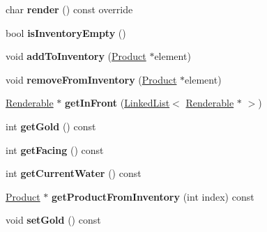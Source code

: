 \begin{DoxyCompactItemize}
\item 
\mbox{\label{class_player_a6daa4259fd7a2b382801f5e33e81960b}} 
char {\bfseries render} () const override
\item 
\mbox{\label{class_player_ab3c93d041cfa17ac2a10239979d9b1ca}} 
bool {\bfseries is\+Inventory\+Empty} ()
\item 
\mbox{\label{class_player_a4705a0783e10c3ca0e5d3c11e3d93f36}} 
void {\bfseries add\+To\+Inventory} (\mbox{\hyperlink{class_product}{Product}} $\ast$element)
\item 
\mbox{\label{class_player_a3244e8bdef443ebe88449b756df14bfe}} 
void {\bfseries remove\+From\+Inventory} (\mbox{\hyperlink{class_product}{Product}} $\ast$element)
\item 
\mbox{\label{class_player_afd247cafe55af73b244129fd5ffe2220}} 
\mbox{\hyperlink{class_renderable}{Renderable}} $\ast$ {\bfseries get\+In\+Front} (\mbox{\hyperlink{class_linked_list}{Linked\+List}}$<$ \mbox{\hyperlink{class_renderable}{Renderable}} $\ast$ $>$)
\item 
\mbox{\label{class_player_af8eaab3b610debd175d424823e4af144}} 
int {\bfseries get\+Gold} () const
\item 
\mbox{\label{class_player_ac72a41034f2f445de714af0adf6f258b}} 
int {\bfseries get\+Facing} () const
\item 
\mbox{\label{class_player_a8cc8f60daa06748d93b403b93e887082}} 
int {\bfseries get\+Current\+Water} () const
\item 
\mbox{\label{class_player_a19bcee8132343b53a96872e6859747c0}} 
\mbox{\hyperlink{class_product}{Product}} $\ast$ {\bfseries get\+Product\+From\+Inventory} (int index) const
\item 
\mbox{\label{class_player_a56ef7ff2a7c93abce4ccc651c415ded8}} 
void {\bfseries set\+Gold} () const
\item 
\mbox{\label{class_player_a3f2c01ca65976b3a3304dfcc4fcd8e87}} 

\end{DoxyCompactItemize}

